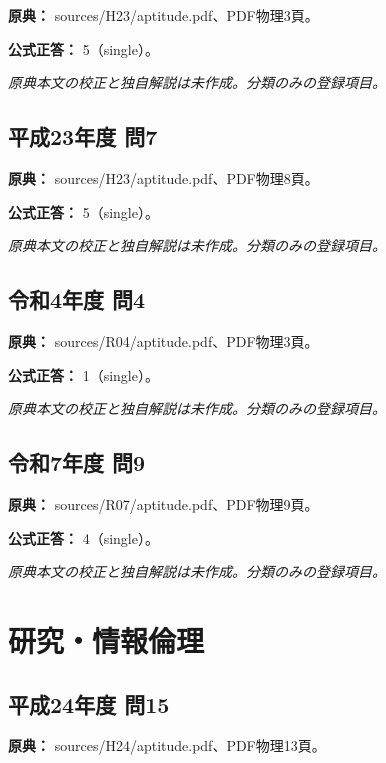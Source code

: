 \noindent\textbf{原典：} sources/H23/aptitude.pdf、PDF物理3頁。

\textbf{公式正答：} 5（single）。

\par\textit{原典本文の校正と独自解説は未作成。分類のみの登録項目。}

\subsection{平成23年度 問7}
\label{q:h23-reg-apt-07}

\noindent\textbf{原典：} sources/H23/aptitude.pdf、PDF物理8頁。

\textbf{公式正答：} 5（single）。

\par\textit{原典本文の校正と独自解説は未作成。分類のみの登録項目。}

\subsection{令和4年度 問4}
\label{q:r04-reg-apt-04}

\noindent\textbf{原典：} sources/R04/aptitude.pdf、PDF物理3頁。

\textbf{公式正答：} 1（single）。

\par\textit{原典本文の校正と独自解説は未作成。分類のみの登録項目。}

\subsection{令和7年度 問9}
\label{q:r07-reg-apt-09}

\noindent\textbf{原典：} sources/R07/aptitude.pdf、PDF物理9頁。

\textbf{公式正答：} 4（single）。

\par\textit{原典本文の校正と独自解説は未作成。分類のみの登録項目。}

\section{研究・情報倫理}

\subsection{平成24年度 問15}
\label{q:h24-reg-apt-15}

\noindent\textbf{原典：} sources/H24/aptitude.pdf、PDF物理13頁。

